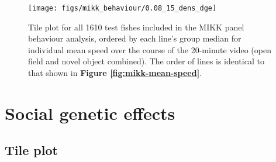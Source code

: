 \documentclass[
]{book}
\begin{document}
\begin{figure}
\texttt{[image: figs/mikk\_behaviour/0.08\_15\_dens\_dge]} \caption{Tile plot for all 1610 test fishes included in the MIKK panel behaviour analysis, ordered by each line's group median for individual mean speed over the course of the 20-minute video (open field and novel object combined). The order of lines is identical to that shown in \textbf{Figure \ref{fig:mikk-mean-speed}}.}\label{fig:mikk-all-dens-dge}
\end{figure}

\hypertarget{social-genetic-effects-4}{%
\section{Social genetic effects}\label{social-genetic-effects-4}}

\hypertarget{tile-plot-1}{%
\subsection{Tile plot}\label{tile-plot-1}}
\end{document}
